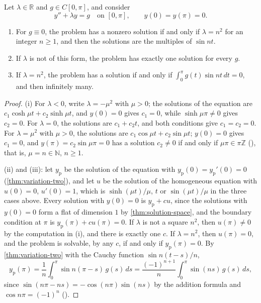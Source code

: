 \begin{proposition}
\label{prop:boundary-value}
Let $\lambda\in\mathbb R$ and $g\in C[0,\pi]$, and consider
\[
y''+\lambda y=g\quad\text{on }[0,\pi],\qquad y(0)=y(\pi)=0 .
\]
\begin{enumerate}
\item For $g\equiv0$, the problem has a nonzero solution if and only if $\lambda=n^2$ for an integer $n\ge1$, and then the solutions are the multiples of $\sin nt$.
\item If $\lambda$ is not of this form, the problem has exactly one solution for every $g$.
\item If $\lambda=n^2$, the problem has a solution if and only if $\int_0^\pi g(t)\sin nt\,dt=0$, and then infinitely many.
\end{enumerate}
\end{proposition}

\begin{proof}
(i) For $\lambda<0$, write $\lambda=-\mu^2$ with $\mu>0$; the solutions of the equation are $c_1\cosh\mu t+c_2\sinh\mu t$, and $y(0)=0$ gives $c_1=0$, while $\sinh\mu\pi\ne0$ gives $c_2=0$. For $\lambda=0$, the solutions are $c_1+c_2t$, and both conditions give $c_1=c_2=0$. For $\lambda=\mu^2$ with $\mu>0$, the solutions are $c_1\cos\mu t+c_2\sin\mu t$; $y(0)=0$ gives $c_1=0$, and $y(\pi)=c_2\sin\mu\pi=0$ has a solution $c_2\ne0$ if and only if $\mu\pi\in\pi\mathbb Z$ (), that is, $\mu=n\in\mathbb N$, $n\ge1$.

(ii) and (iii): let $y_{\mathrm p}$ be the solution of the equation with $y_{\mathrm p}(0)=y_{\mathrm p}'(0)=0$ (\cref{thm:variation-two}), and let $u$ be the solution of the homogeneous equation with $u(0)=0$, $u'(0)=1$, which is $\sinh(\mu t)/\mu$, $t$ or $\sin(\mu t)/\mu$ in the three cases above. Every solution with $y(0)=0$ is $y_{\mathrm p}+cu$, since the solutions with $y(0)=0$ form a flat of dimension $1$ by \cref{thm:solution-space}, and the boundary condition at $\pi$ is $y_{\mathrm p}(\pi)+cu(\pi)=0$. If $\lambda$ is not a square $n^2$, then $u(\pi)\ne0$ by the computation in (i), and there is exactly one $c$. If $\lambda=n^2$, then $u(\pi)=0$, and the problem is solvable, by any $c$, if and only if $y_{\mathrm p}(\pi)=0$. By \cref{thm:variation-two} with the Cauchy function $\sin n(t-s)/n$,
\[
y_{\mathrm p}(\pi)=\frac1n\int_0^\pi\sin n(\pi-s)\,g(s)\,ds=\frac{(-1)^{n+1}}n\int_0^\pi\sin(ns)\,g(s)\,ds ,
\]
since $\sin(n\pi-ns)=-\cos(n\pi)\sin(ns)$ by the addition formula and $\cos n\pi=(-1)^n$ ().
\end{proof}

